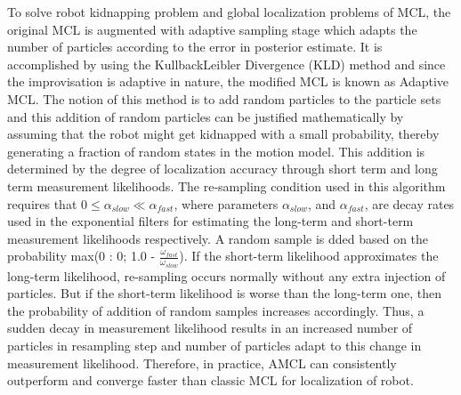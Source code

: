 \documentclass[journal,twoside]{IEEEtran}
\begin{document}
\par\noindent To solve robot kidnapping problem and global localization problems of MCL, the original MCL is augmented with adaptive sampling stage which adapts the number of particles according to the error in posterior estimate. It is accomplished by using the KullbackLeibler Divergence (KLD) method and since the improvisation is adaptive in nature, the modified MCL is known as Adaptive MCL. The notion of this method is to add random particles to the particle sets and this addition of random particles can be justified mathematically by assuming that the robot might get kidnapped with a small probability, thereby generating a fraction of random states in the motion model. This addition is determined by the degree of localization accuracy through short term and long term measurement likelihoods. The re-sampling condition used in this algorithm requires that $0\leq\alpha_{slow}\ll\alpha_{fast}$, where parameters $\alpha_{slow}$, and $\alpha_{fast}$, are decay rates used in the exponential filters for estimating the long-term and short-term measurement likelihoods respectively. A random sample is dded based on the probability max(0 : 0; 1.0 - $\frac{\omega_{fast}}{\omega_{slow}}$). If the short-term likelihood approximates the long-term likelihood, re-sampling occurs normally without any extra injection of particles. But if the short-term likelihood is worse than the long-term one, then the probability of addition of random samples increases accordingly. Thus, a sudden decay in measurement likelihood results in an increased number of particles in resampling step and number of particles adapt to this change in measurement likelihood. Therefore, in practice, AMCL can consistently outperform and converge faster than classic MCL for localization of robot.
\end{document}
